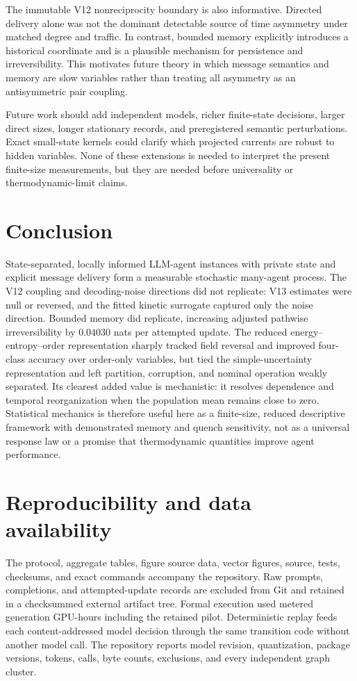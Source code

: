 \documentclass[12pt]{article}
\begin{document}
The immutable V12 nonreciprocity boundary is also informative. Directed
delivery alone was not the dominant detectable source of time asymmetry under
matched degree and traffic. In contrast, bounded memory explicitly introduces
a historical coordinate and is a plausible mechanism for persistence and
irreversibility. This motivates future theory in which message semantics and
memory are slow variables rather than treating all asymmetry as an
antisymmetric pair coupling.

Future work should add independent models, richer finite-state decisions,
larger direct sizes, longer stationary records, and preregistered semantic
perturbations. Exact small-state kernels could clarify which projected currents
are robust to hidden variables. None of these extensions is needed to interpret
the present finite-size measurements, but they are needed before universality or
thermodynamic-limit claims.

\section{Conclusion}

State-separated, locally informed LLM-agent instances with private state and
explicit message delivery form a measurable stochastic many-agent process. The
V12 coupling and decoding-noise
directions did not replicate: V13 estimates were null or reversed, and the
fitted kinetic surrogate captured only the noise direction. Bounded memory did
replicate, increasing adjusted pathwise irreversibility by $0.04030$ nats per
attempted update. The reduced energy--entropy--order representation sharply
tracked field reversal and improved four-class accuracy over order-only
variables, but tied the simple-uncertainty representation and left partition,
corruption, and nominal operation weakly separated. Its clearest added value is
mechanistic: it resolves dependence and temporal reorganization when the
population mean remains close to zero. Statistical mechanics is therefore
useful here as a finite-size, reduced descriptive framework with demonstrated
memory and quench sensitivity, not as a universal response law or a promise
that thermodynamic quantities improve agent performance.

\section*{Reproducibility and data availability}

The protocol, aggregate tables, figure source data, vector figures, source,
tests, checksums, and exact commands accompany the repository. Raw prompts,
completions, and attempted-update records are excluded from Git and retained in
a checksummed external artifact tree. Formal execution used
\VFourteenGPUHours{} metered generation GPU-hours including the retained pilot.
Deterministic replay feeds
each content-addressed model decision through the same transition code without
another model call. The repository reports model revision, quantization,
package versions, tokens, calls, byte counts, exclusions, and every independent
graph cluster.
\end{document}

